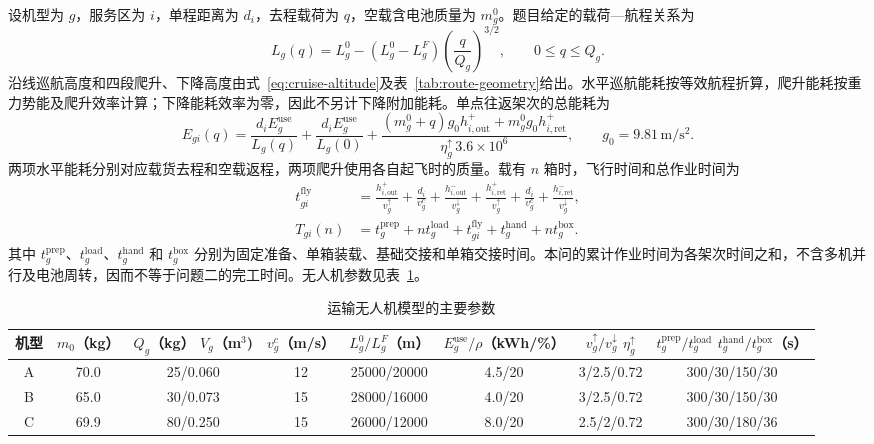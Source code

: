 \documentclass[bwprint,fontset=windows]{gmcmthesis}
\begin{document}
设机型为 $g$，服务区为 $i$，单程距离为 $d_i$，去程载荷为 $q$，空载含电池质量为 $m_g^0$。题目给定的载荷—航程关系为
\begin{equation}
L_g(q)=L_g^0-(L_g^0-L_g^F)\left(\frac{q}{Q_g}\right)^{3/2},
\qquad 0\le q\le Q_g .
\label{eq:q1-equivalent-range}
\end{equation}
沿线巡航高度和四段爬升、下降高度由式~\eqref{eq:cruise-altitude}及表~\ref{tab:route-geometry}给出。水平巡航能耗按等效航程折算，爬升能耗按重力势能及爬升效率计算；下降能耗效率为零，因此不另计下降附加能耗。单点往返架次的总能耗为
\begin{equation}
E_{gi}(q)
=
\frac{d_iE_g^{\mathrm{use}}}{L_g(q)}
+\frac{d_iE_g^{\mathrm{use}}}{L_g(0)}
+\frac{(m_g^0+q)g_0h_{i,\mathrm{out}}^+
      +m_g^0g_0h_{i,\mathrm{ret}}^+}
{\eta_g^\uparrow\,3.6\times10^6},
\qquad g_0=9.81\,\mathrm{m/s^2}.
\label{eq:q1-sortie-energy}
\end{equation}
两项水平能耗分别对应载货去程和空载返程，两项爬升使用各自起飞时的质量。载有 $n$ 箱时，飞行时间和总作业时间为
\begin{align}
t_{gi}^{\mathrm{fly}}
&=\frac{h_{i,\mathrm{out}}^+}{v_g^\uparrow}
+\frac{d_i}{v_g^c}
+\frac{h_{i,\mathrm{out}}^-}{v_g^\downarrow}
+\frac{h_{i,\mathrm{ret}}^+}{v_g^\uparrow}
+\frac{d_i}{v_g^c}
+\frac{h_{i,\mathrm{ret}}^-}{v_g^\downarrow},\\
T_{gi}(n)
&=t_g^{\mathrm{prep}}+nt_g^{\mathrm{load}}
+t_{gi}^{\mathrm{fly}}+t_g^{\mathrm{hand}}+nt_g^{\mathrm{box}} .
\label{eq:q1-sortie-time}
\end{align}
其中 $t_g^{\mathrm{prep}}$、$t_g^{\mathrm{load}}$、$t_g^{\mathrm{hand}}$ 和 $t_g^{\mathrm{box}}$ 分别为固定准备、单箱装载、基础交接和单箱交接时间。本问的累计作业时间为各架次时间之和，不含多机并行及电池周转，因而不等于问题二的完工时间。无人机参数见表~\ref{tab:q1-uav-parameters}。

\begin{table}[!htbp]
\centering
\caption{运输无人机模型的主要参数}
\label{tab:q1-uav-parameters}
\footnotesize
\setlength{\tabcolsep}{3pt}
\renewcommand{\arraystretch}{1.1}
\begin{tabular}{@{}cccccccc@{}}
\toprule
机型
& $m_0$（kg）
& \shortstack{$Q_g$（kg）\\$V_g$（m$^3$)}
& $v_g^c$（m/s）
& $L_g^0/L_g^F$（m）
& $E_g^{\mathrm{use}}/\rho$（kWh/\%）
& \shortstack{$v_g^\uparrow/v_g^\downarrow$\\$\eta_g^\uparrow$}
& \shortstack{$t_g^{\mathrm{prep}}/t_g^{\mathrm{load}}$\\$t_g^{\mathrm{hand}}/t_g^{\mathrm{box}}$（s）} \\
\midrule
A & 70.0 & 25/0.060 & 12 & 25000/20000 & 4.5/20 & 3/2.5/0.72 & 300/30/150/30 \\
B & 65.0 & 30/0.073 & 15 & 28000/16000 & 4.0/20 & 3/2.5/0.72 & 300/30/150/30 \\
C & 69.9 & 80/0.250 & 15 & 26000/12000 & 8.0/20 & 2.5/2/0.72 & 300/30/180/36 \\
\bottomrule
\end{tabular}
\end{table}
\end{document}

